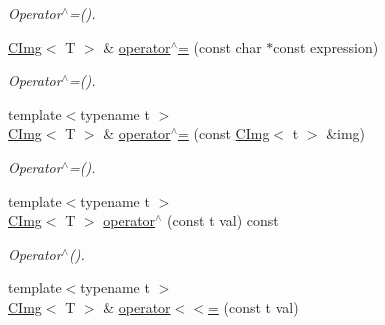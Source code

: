\begin{DoxyCompactItemize}
\begin{DoxyCompactList}\small\item\em Operator$^\wedge$=(). \item\end{DoxyCompactList}\item 
\hypertarget{structcimg__library_1_1CImg_a724f32fb36dd9d03d33aee97c8bc9283}{
\hyperlink{structcimg__library_1_1CImg}{CImg}$<$ T $>$ \& \hyperlink{structcimg__library_1_1CImg_a724f32fb36dd9d03d33aee97c8bc9283}{operator$^\wedge$=} (const char $\ast$const expression)}
\label{structcimg__library_1_1CImg_a724f32fb36dd9d03d33aee97c8bc9283}

\begin{DoxyCompactList}\small\item\em Operator$^\wedge$=(). \item\end{DoxyCompactList}\item 
\hypertarget{structcimg__library_1_1CImg_ac51bdadcbdffee3dfda3914ec6dfdbfd}{
{\footnotesize template$<$typename t $>$ }\\\hyperlink{structcimg__library_1_1CImg}{CImg}$<$ T $>$ \& \hyperlink{structcimg__library_1_1CImg_ac51bdadcbdffee3dfda3914ec6dfdbfd}{operator$^\wedge$=} (const \hyperlink{structcimg__library_1_1CImg}{CImg}$<$ t $>$ \&img)}
\label{structcimg__library_1_1CImg_ac51bdadcbdffee3dfda3914ec6dfdbfd}

\begin{DoxyCompactList}\small\item\em Operator$^\wedge$=(). \item\end{DoxyCompactList}\item 
\hypertarget{structcimg__library_1_1CImg_a2186299dad118388af02579e727cf5c8}{
{\footnotesize template$<$typename t $>$ }\\\hyperlink{structcimg__library_1_1CImg}{CImg}$<$ T $>$ \hyperlink{structcimg__library_1_1CImg_a2186299dad118388af02579e727cf5c8}{operator$^\wedge$} (const t val) const }
\label{structcimg__library_1_1CImg_a2186299dad118388af02579e727cf5c8}

\begin{DoxyCompactList}\small\item\em Operator$^\wedge$(). \item\end{DoxyCompactList}\item 
\hypertarget{structcimg__library_1_1CImg_a197e168fdec7926abd59ffedeb233eac}{
{\footnotesize template$<$typename t $>$ }\\\hyperlink{structcimg__library_1_1CImg}{CImg}$<$ T $>$ \& \hyperlink{structcimg__library_1_1CImg_a197e168fdec7926abd59ffedeb233eac}{operator$<$$<$=} (const t val)}
\label{structcimg__library_1_1CImg_a197e168fdec7926abd59ffedeb233eac}


\end{DoxyCompactItemize}
